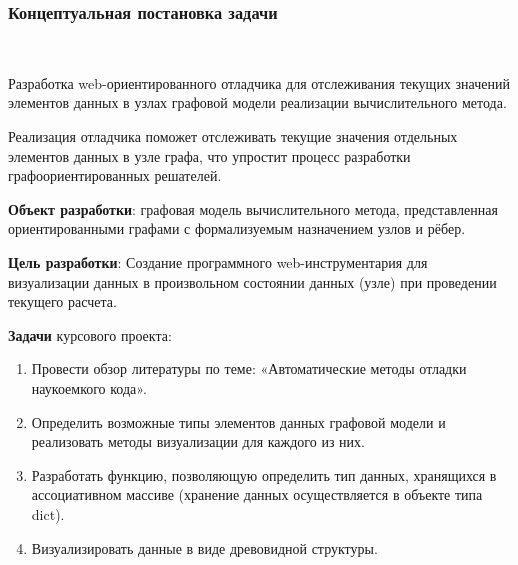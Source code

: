 \def\notedate{2021.12.19}
\def\currentauthor{Крехтунова Д.Д. (РК6-73Б)}

\subsubsection{Концептуальная постановка задачи}\

Разработка web-ориентированного отладчика для отслеживания текущих значений элементов данных в узлах графовой модели реализации вычислительного метода.

Реализация отладчика поможет отслеживать текущие значения отдельных элементов данных в узле графа, что упростит процесс разработки графоориентированных решателей. 
\newline

\textbf{Объект разработки}: графовая модель вычислительного метода, представленная ориентированными графами с формализуемым назначением узлов и рёбер.

\textbf{Цель разработки}: Создание программного web-инструментария для визуализации данных в произвольном состоянии данных (узле) при проведении текущего расчета.

\textbf{Задачи} курсового проекта:
\begin{enumerate}
	\item Провести обзор литературы по теме: «Автоматические методы отладки наукоемкого кода».
	\item Определить возможные типы элементов данных графовой модели и реализовать методы визуализации для каждого из них.
	\item Разработать функцию, позволяющую определить тип данных, хранящихся в ассоциативном массиве (хранение данных осуществляется в объекте типа dict). 
	\item Визуализировать данные в виде древовидной структуры.
\end{enumerate}


\noteattributes{}


